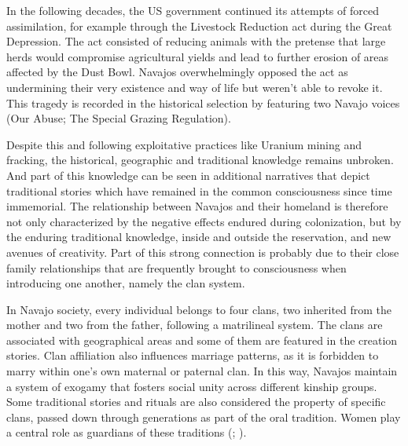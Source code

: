 In the following decades, the US government continued its attempts of forced assimilation, for example through the Livestock Reduction act during the Great Depression. The act consisted of reducing animals with the pretense that large herds would compromise agricultural yields and lead to further erosion of areas affected by the Dust Bowl. Navajos overwhelmingly opposed the act as undermining their very existence and way of life but weren't able to revoke it. This tragedy is recorded in the historical selection by featuring two Navajo voices (Our Abuse; The Special Grazing Regulation).

Despite this and following exploitative practices like Uranium mining and fracking, the historical, geographic and traditional knowledge remains unbroken. And part of this knowledge can be seen in additional narratives that depict traditional stories which have remained in the common consciousness since time immemorial. The relationship between Navajos and their homeland is therefore not only characterized by the negative effects endured during colonization, but by the enduring traditional knowledge, inside and outside the reservation, and new avenues of creativity. Part of this strong connection is probably due to their close family relationships that are frequently brought to consciousness when introducing one another, namely the clan system. 

In Navajo society, every individual belongs to four clans, two inherited from the mother and two from the father, following a matrilineal system. The clans are associated with geographical areas and some of them are featured in the creation stories. Clan affiliation also influences marriage patterns, as it is forbidden to marry within one's own maternal or paternal clan. In this way, Navajos maintain a system of exogamy that fosters social unity across different kinship groups. Some traditional stories and rituals are also considered the property of specific clans, passed down through generations as part of the oral tradition. Women play a central role as guardians of these traditions (\cite{McCloskey:2007mb}; \cite{Denetdale:2015vo}).
    
